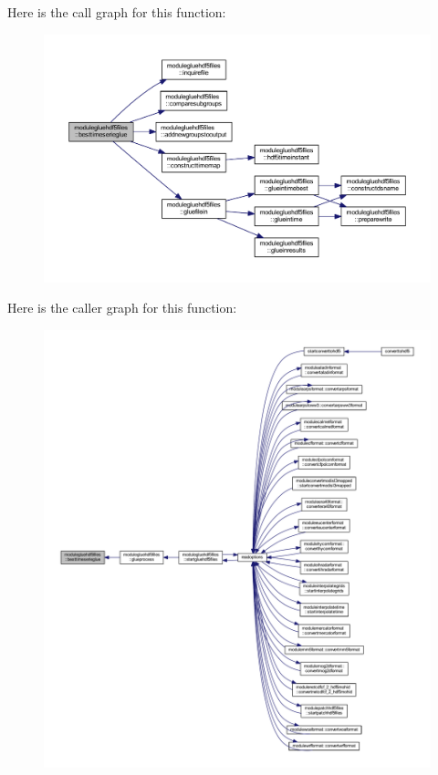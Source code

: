 Here is the call graph for this function\+:\nopagebreak
\begin{figure}[H]
\begin{center}
\leavevmode
\includegraphics[width=350pt]{namespacemodulegluehdf5files_a88e3c5be0d990bbff5725309d8c04656_cgraph}
\end{center}
\end{figure}
Here is the caller graph for this function\+:\nopagebreak
\begin{figure}[H]
\begin{center}
\leavevmode
\includegraphics[width=350pt]{namespacemodulegluehdf5files_a88e3c5be0d990bbff5725309d8c04656_icgraph}
\end{center}
\end{figure}
\mbox{\label{namespacemodulegluehdf5files_a725536a9cfa2982b35ce20a2bd143ad8}} 
